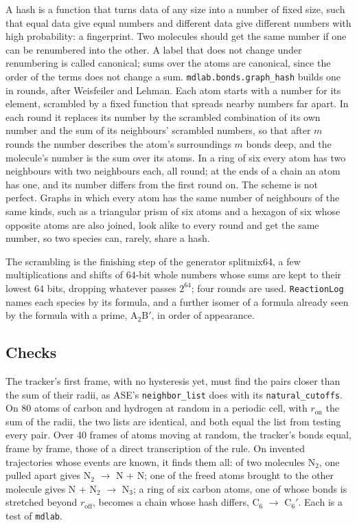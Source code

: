 \begin{toolbox}
A hash is a function that turns data of any size into a number of fixed
size, such that equal data give equal numbers and different data give
different numbers with high probability: a fingerprint. Two molecules
should get the same number if one can be renumbered into the other. A
label that does not change under renumbering is called canonical; sums
over the atoms are canonical, since the order of the terms does not
change a sum. \texttt{mdlab.bonds.graph\_hash} builds one in rounds, after
Weisfeiler and Lehman. Each atom starts with a number for its element,
scrambled by a fixed function that spreads nearby numbers far apart. In
each round it replaces its number by the scrambled combination of its own
number and the sum of its neighbours' scrambled numbers, so that after
$m$ rounds the number describes the atom's surroundings $m$ bonds deep,
and the molecule's number is the sum over its atoms. In a ring of six
every atom has two neighbours with two neighbours each, all round; at the
ends of a chain an atom has one, and its number differs from the first
round on. The scheme is not perfect. Graphs in which every atom has the
same number of neighbours of the same kinds, such as a triangular prism of
six atoms and a hexagon of six whose opposite atoms are also joined, look
alike to every round and get the same number, so two species can, rarely,
share a hash.
\end{toolbox}

\noindent The scrambling is the finishing step of the generator
splitmix64, a few multiplications and shifts of 64-bit whole numbers whose
sums are kept to their lowest 64 bits, dropping whatever passes
$2^{64}$; four rounds are used. \texttt{ReactionLog}
names each species by its formula, and a further isomer of a formula
already seen by the formula with a prime, A$_2$B$'$, in order of
appearance.

\subsection*{Checks}

The tracker's first frame, with no hysteresis yet, must find the pairs
closer than the sum of their radii, as ASE's \texttt{neighbor\_list} does
with its \texttt{natural\_cutoffs}. On 80 atoms of carbon and hydrogen at
random in a periodic cell, with $r_{\mathrm{on}}$ the sum of the radii,
the two lists are identical,
and both equal the list from testing every pair. Over 40 frames of atoms
moving at random, the tracker's bonds equal, frame by frame, those of a
direct transcription of the rule. On invented trajectories whose events
are known, it finds them all: of two molecules N$_2$, one pulled apart gives N$_2$
$\to$ N + N; one of the freed atoms brought to the other molecule gives N
+ N$_2$ $\to$ N$_3$; a ring of six carbon atoms, one of whose bonds is
stretched beyond $r_{\mathrm{off}}$, becomes a chain whose hash differs,
C$_6$ $\to$ C$_6'$. Each is a test of \texttt{mdlab}.

